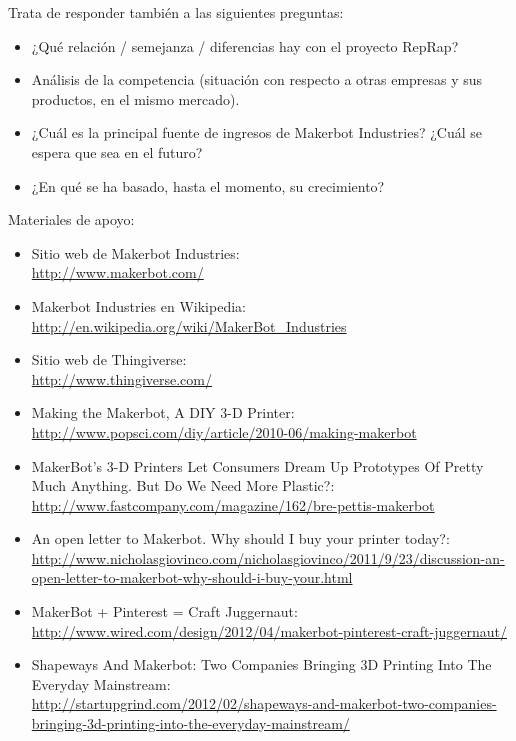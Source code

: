\documentclass[a4paper,12pt]{article}
\begin{document}
Trata de responder también a las siguientes preguntas:

\begin{itemize}
\item ¿Qué relación / semejanza / diferencias hay con el proyecto RepRap?
\item Análisis de la competencia (situación con respecto a otras empresas y sus productos, en el mismo mercado).
\item ¿Cuál es la principal fuente de ingresos de Makerbot Industries? ¿Cuál se espera que sea en el futuro?
\item ¿En qué se ha basado, hasta el momento, su crecimiento?
\end{itemize}

Materiales de apoyo:

\begin{itemize}
\item Sitio web de Makerbot Industries: \\
  \url{http://www.makerbot.com/}
\item Makerbot Industries en Wikipedia: \\
  \url{http://en.wikipedia.org/wiki/MakerBot_Industries}
\item Sitio web de Thingiverse: \\
  \url{http://www.thingiverse.com/}
\item Making the Makerbot, A DIY 3-D Printer: \\
  \url{http://www.popsci.com/diy/article/2010-06/making-makerbot}
\item MakerBot's 3-D Printers Let Consumers Dream Up Prototypes Of Pretty Much Anything. But Do We Need More Plastic?: \\
  \url{http://www.fastcompany.com/magazine/162/bre-pettis-makerbot}
\item An open letter to Makerbot. Why should I buy your printer today?: \\
  \url{http://www.nicholasgiovinco.com/nicholasgiovinco/2011/9/23/discussion-an-open-letter-to-makerbot-why-should-i-buy-your.html}
\item MakerBot + Pinterest = Craft Juggernaut: \\
  \url{http://www.wired.com/design/2012/04/makerbot-pinterest-craft-juggernaut/}
\item Shapeways And Makerbot: Two Companies Bringing 3D Printing Into The Everyday Mainstream: \\
  \url{http://startupgrind.com/2012/02/shapeways-and-makerbot-two-companies-bringing-3d-printing-into-the-everyday-mainstream/}

\end{itemize}
\end{document}
